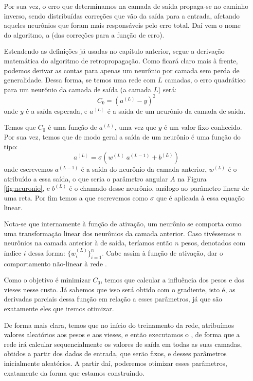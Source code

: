 Por sua vez, o erro que determinamos na camada de saída propaga-se no caminho inverso, sendo distribuídas correções que vão da saída para a entrada, afetando aqueles neurônios que foram mais responsáveis pelo erro total. Daí vem o nome do algoritmo, a  (das correções para a função de erro).

Estendendo as definições já usadas no capítulo anterior, segue a derivação matemática do algoritmo de retropropagação. Como ficará claro mais à frente, podemos derivar as contas para apenas um neurônio por camada sem perda de generalidade. Dessa forma, se temos uma rede com $L$ camadas, o erro quadrático para um neurônio da camada de saída (a camada $L$) será:
\begin{equation}\label{retro:custo}
C_0 = (a^{(L)} - y)^2
\end{equation}
onde $y$ é a saída esperada, e $a^{(L)}$ é a saída de um neurônio da camada de saída.

Temos que $C_0$ é uma função de $a^{(L)}$, uma vez que $y$ é um valor fixo conhecido. Por sua vez, temos que de modo geral a saída de um neurônio é uma função do tipo:
\begin{equation}\label{retro:neuron}
a^{(L)} = \sigma(w^{(L)}~a^{(L-1)} + b^{(L)})
\end{equation}
onde escrevemos $a^{(L-1)}$ é a saída do neurônio da camada anterior, $w^{(L)}$ é o  atribuído a essa saída, o que seria o parâmetro angular $A$ na Figura \ref{fig:neuronio}, e $b^{(L)}$ é o chamado  desse neurônio, análogo ao parâmetro linear de uma reta. Por fim temos a  que escrevemos como $\sigma$ que é aplicada à essa equação linear.

Nota-se que internamente à função de ativação, um neurônio se comporta como uma transformação linear dos neurônios da camada anterior. Caso tivéssemos $n$ neurônios na camada anterior à de saída, teríamos então $n$ pesos, denotados com índice $i$ dessa forma: $\{ w_i^{(L)} \}_{i=1}^n$. Cabe assim à função de ativação, dar o comportamento não-linear à rede .

Como o objetivo é minimizar $C_0$, temos que calcular a influência dos pesos e dos vieses nesse custo. Já sabemos que isso será obtido com o gradiente, isto é, as derivadas parciais dessa função em relação a esses parâmetros, já que são exatamente eles que iremos otimizar. 

De forma mais clara, temos que no início do treinamento da rede, atribuímos valores aleatórios aos pesos e aos vieses, e então executamos o , de forma que a rede irá calcular sequencialmente os valores de saída em todas as suas camadas, obtidos a partir dos dados de entrada, que serão fixos, e desses parâmetros inicialmente aleatórios. A partir daí, poderemos otimizar esses parâmetros, exatamente da forma que estamos construindo.

